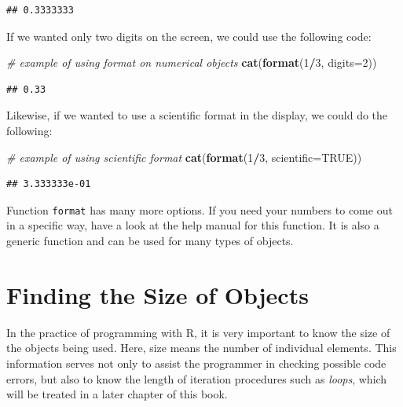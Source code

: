 \documentclass[11pt,]{book}
\newenvironment{Shaded}{\begin{snugshade}}{\end{snugshade}}
\newcommand{\KeywordTok}[1]{\textcolor[rgb]{0.27,0.27,0.27}{\textbf{#1}}}
\newcommand{\DataTypeTok}[1]{\textcolor[rgb]{0.27,0.27,0.27}{#1}}
\newcommand{\DecValTok}[1]{\textcolor[rgb]{0.06,0.06,0.06}{#1}}
\newcommand{\CommentTok}[1]{\textcolor[rgb]{0.56,0.35,0.01}{\textit{#1}}}
\newcommand{\OtherTok}[1]{\textcolor[rgb]{0.56,0.35,0.01}{#1}}
\newcommand{\OperatorTok}[1]{\textcolor[rgb]{0.81,0.36,0.00}{\textbf{#1}}}
\newcommand{\NormalTok}[1]{#1}
\begin{document}
\begin{verbatim}
## 0.3333333
\end{verbatim}

If we wanted only two digits on the screen, we could use the following
code:

\begin{Shaded}
\begin{Highlighting}[]
\CommentTok{# example of using format on numerical objects}
\KeywordTok{cat}\NormalTok{(}\KeywordTok{format}\NormalTok{(}\DecValTok{1}\OperatorTok{/}\DecValTok{3}\NormalTok{, }\DataTypeTok{digits=}\DecValTok{2}\NormalTok{))}
\end{Highlighting}
\end{Shaded}

\begin{verbatim}
## 0.33
\end{verbatim}

Likewise, if we wanted to use a scientific format in the display, we
could do the following:

\begin{Shaded}
\begin{Highlighting}[]
\CommentTok{# example of using scientific format}
\KeywordTok{cat}\NormalTok{(}\KeywordTok{format}\NormalTok{(}\DecValTok{1}\OperatorTok{/}\DecValTok{3}\NormalTok{, }\DataTypeTok{scientific=}\OtherTok{TRUE}\NormalTok{))}
\end{Highlighting}
\end{Shaded}

\begin{verbatim}
## 3.333333e-01
\end{verbatim}

Function \texttt{format} has many more options. If you need your numbers
to come out in a specific way, have a look at the help manual for this
function. It is also a generic function and can be used for many types
of objects.

\section{Finding the Size of Objects}\label{finding-the-size-of-objects}

In the practice of programming with R, it is very important to know the
size of the objects being used. Here, size means the number of
individual elements. This information serves not only to assist the
programmer in checking possible code errors, but also to know the length
of iteration procedures such as \emph{loops}, which will be treated in a
later chapter of this book.
\end{document}
